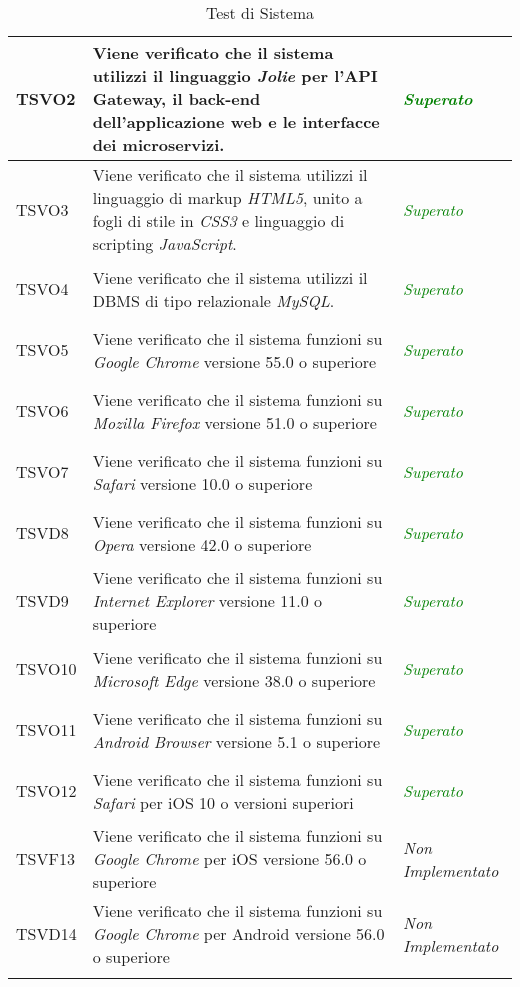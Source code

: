 \begin{longtable}{|>{\centering\arraybackslash}p{2.3cm}|>{\centering\arraybackslash}p{7.5cm} | >{\centering\arraybackslash}p{3.8cm}|}
		\hypertarget{TSVO2}{TSVO2} & Viene verificato che il sistema utilizzi il linguaggio \textit{Jolie} per l'API Gateway, il back-end dell'applicazione web e le interfacce dei microservizi. & \textcolor{Green}{\textit{Superato}}\\ \hline
		\hypertarget{TSVO3}{TSVO3} & Viene verificato che il sistema utilizzi il linguaggio di markup \textit{HTML5}, unito a fogli di stile in \textit{CSS3} e linguaggio di scripting \textit{JavaScript}. & \textcolor{Green}{\textit{Superato}}\\ \hline
		\hypertarget{TSVO4}{TSVO4} & Viene verificato che il sistema utilizzi il DBMS di tipo relazionale \textit{MySQL}. & \textcolor{Green}{\textit{Superato}}\\ \hline
		\hypertarget{TSVO5}{TSVO5} & Viene verificato che il sistema funzioni su \textit{Google Chrome} versione 55.0 o superiore & \textcolor{Green}{\textit{Superato}}\\ \hline
		\hypertarget{TSVO6}{TSVO6} & Viene verificato che il sistema funzioni su \textit{Mozilla Firefox} versione 51.0 o superiore & \textcolor{Green}{\textit{Superato}}\\ \hline
		\hypertarget{TSVO7}{TSVO7} & Viene verificato che il sistema funzioni su \textit{Safari} versione 10.0 o superiore & \textcolor{Green}{\textit{Superato}}\\ \hline
		\hypertarget{TSVD8}{TSVD8} & Viene verificato che il sistema funzioni su \textit{Opera} versione 42.0 o superiore & \textcolor{Green}{\textit{Superato}}\\ \hline
		\hypertarget{TSVD9}{TSVD9} & Viene verificato che il sistema funzioni su \textit{Internet Explorer} versione 11.0 o superiore & \textcolor{Green}{\textit{Superato}}\\ \hline
		\hypertarget{TSVO10}{TSVO10} & Viene verificato che il sistema funzioni su \textit{Microsoft Edge} versione 38.0 o superiore & \textcolor{Green}{\textit{Superato}}\\ \hline
		\hypertarget{TSVO11}{TSVO11} & Viene verificato che il sistema funzioni su \textit{Android Browser} versione 5.1 o superiore & \textcolor{Green}{\textit{Superato}}\\ \hline
		\hypertarget{TSVO12}{TSVO12} & Viene verificato che il sistema funzioni su \textit{Safari} per iOS 10 o versioni superiori & \textcolor{Green}{\textit{Superato}}\\ \hline
		\hypertarget{TSVF13}{TSVF13} & Viene verificato che il sistema funzioni su \textit{Google Chrome} per iOS versione 56.0 o superiore & \textit{Non Implementato}\\ \hline
		\hypertarget{TSVD14}{TSVD14} & Viene verificato che il sistema funzioni su \textit{Google Chrome} per Android versione 56.0 o superiore & \textit{Non Implementato}\\ \hline
		\caption[Test di Sistema]{Test di Sistema}
		\label{tabella:test1}
	\end{longtable}
	\clearpage
	
